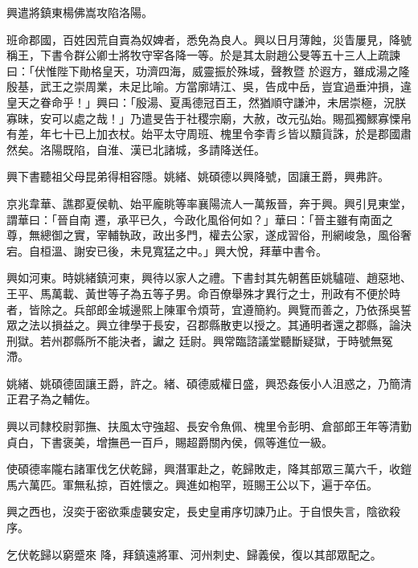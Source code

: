 \begin{pinyinscope}
 興遣將鎮東楊佛嵩攻陷洛陽。



 班命郡國，百姓因荒自賣為奴婢者，悉免為良人。興以日月薄蝕，災眚屢見，降號稱王，下書令群公卿士將牧守宰各降一等。於是其太尉趙公旻等五十三人上疏諫曰：「伏惟陛下勛格皇天，功濟四海，威靈振於殊域，聲教暨
 於遐方，雖成湯之隆殷基，武王之崇周業，未足比喻。方當廓靖江、吳，告成中岳，豈宜過垂沖損，違皇天之眷命乎！」興曰：「殷湯、夏禹德冠百王，然猶順守謙沖，未居崇極，況朕寡昧，安可以處之哉！」乃遣旻告于社稷宗廟，大赦，改元弘始。賜孤獨鰥寡慄帛有差，年七十已上加衣杖。始平太守周班、槐里令李青彡皆以黷貨誅，於是郡國肅然矣。洛陽既陷，自淮、漢已北諸城，多請降送任。



 興下書聽祖父母昆弟得相容隱。姚緒、姚碩德以興降號，固讓王爵，興弗許。



 京兆韋華、譙郡夏侯軌、始平龐眺等率襄陽流人一萬叛晉，奔于興。興引見東堂，謂華曰：「晉自南
 遷，承平已久，今政化風俗何如？」華曰：「晉主雖有南面之尊，無總御之實，宰輔執政，政出多門，權去公家，遂成習俗，刑網峻急，風俗奢宕。自桓溫、謝安已後，未見寬猛之中。」興大悅，拜華中書令。



 興如河東。時姚緒鎮河東，興待以家人之禮。下書封其先朝舊臣姚驢磑、趙惡地、王平、馬萬載、黃世等子為五等子男。命百僚舉殊才異行之士，刑政有不便於時者，皆除之。兵部郎金城邊熙上陳軍令煩苛，宜遵簡約。興覽而善之，乃依孫吳誓眾之法以損益之。興立律學于長安，召郡縣散吏以授之。其通明者還之郡縣，論決刑獄。若州郡縣所不能決者，讞之
 廷尉。興常臨諮議堂聽斷疑獄，于時號無冤滯。



 姚緒、姚碩德固讓王爵，許之。緒、碩德威權日盛，興恐姦佞小人沮惑之，乃簡清正君子為之輔佐。



 興以司隸校尉郭撫、扶風太守強超、長安令魚佩、槐里令彭明、倉部郎王年等清勤貞白，下書褒美，增撫邑一百戶，賜超爵關內侯，佩等進位一級。



 使碩德率隴右諸軍伐乞伏乾歸，興潛軍赴之，乾歸敗走，降其部眾三萬六千，收鎧馬六萬匹。軍無私掠，百姓懷之。興進如枹罕，班賜王公以下，遍于卒伍。



 興之西也，沒奕于密欲乘虛襲安定，長史皇甫序切諫乃止。于自恨失言，陰欲殺序。



 乞伏乾歸以窮蹙來
 降，拜鎮遠將軍、河州刺史、歸義侯，復以其部眾配之。




\end{pinyinscope}
